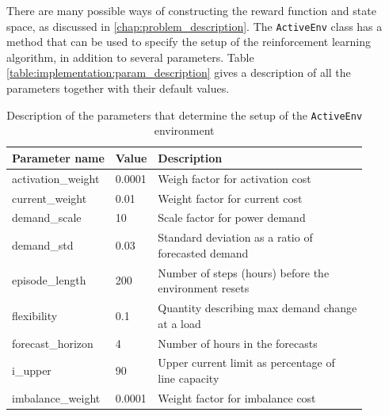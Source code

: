 \documentclass[class=book, crop=false, 11pt]{standalone}
\begin{document}
There are many possible ways of constructing the reward function and state space, as discussed in \ref{chap:problem_description}. The \texttt{ActiveEnv} class has a method that can be used to specify the setup of the reinforcement learning algorithm, in addition to several parameters. Table \ref{table:implementation:param_description} gives a description of all the parameters together with their default values.  


{
\renewcommand{\arraystretch}{1.5}
\begin{table}[ht]
\center
\caption{Description of the parameters that determine the setup of the \texttt{ActiveEnv} environment}
\begin{tabular}{lll}
Parameter name     & Value                                                & Description                                                  \\
\hline
activation\_weight & 0.0001                                               & Weigh factor for activation cost                             \\
current\_weight    & 0.01                                                 & Weight factor for current cost                               \\
demand\_scale      & 10                                                   & Scale factor for power demand                                \\
demand\_std        & 0.03                                                 & \makecell[l]{Standard deviation as a ratio of \\ forecasted demand}           \\
episode\_length    & 200                                                  & \makecell[l]{Number of steps (hours) before the \\ environment resets}        \\
flexibility        & 0.1                                                  & \makecell[l]{Quantity describing  max demand change \\ at a load}              \\
forecast\_horizon  & 4                                                    & Number of hours in the forecasts                             \\
i\_upper           & 90                                                   & \makecell[l]{Upper current limit as percentage of \\line capacity}            \\
imbalance\_weight  & 0.0001                                               & Weight factor for imbalance cost                             \\

\end{tabular}
\end{table}}
\end{document}
